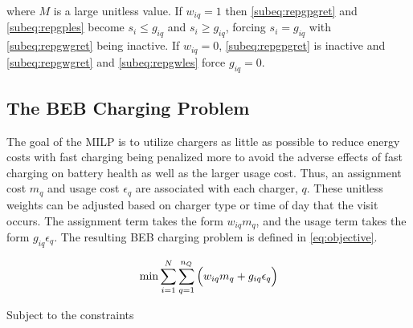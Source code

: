 \documentclass[utf8]{FrontiersinHarvard}
\begin{document}
\noindent where \(M\) is a large unitless value. If \(w_{iq} = 1\) then \autoref{subeq:repgpgret} and
\autoref{subeq:repgples} become \(s_i \leq g_{iq}\) and \(s_i \geq g_{iq}\), forcing \(s_i = g_{iq}\) with \autoref{subeq:repgwgret}
being inactive. If \(w_{iq} = 0\), \autoref{subeq:repgpgret} is inactive and \autoref{subeq:repgwgret} and
\autoref{subeq:repgwles} force \(g_{iq} = 0\).

\subsection{The BEB Charging Problem}
\label{sec:BEB_MILP}
The goal of the MILP is to utilize chargers as little as possible to reduce energy costs with fast charging being
penalized more to avoid the adverse effects of fast charging on battery health as well as the
larger usage cost. Thus, an assignment cost \(m_q\) and usage cost \(\epsilon_q\) are associated with each charger, \(q\).
These unitless weights can be adjusted based on charger type or time of day that the visit
occurs. The assignment term takes the form \(w_{iq}m_q\), and the usage term takes the form \(g_{iq} \epsilon_q\). The
resulting BEB charging problem is defined in \autoref{eq:objective}.

\begin{equation}
\label{eq:objective}
	\min \sum_{i=1}^N \sum_{q=1}^{n_Q} \Big( w_{iq} m_q + g_{iq} \epsilon_q \Big) \\
\end{equation}

Subject to the constraints
\end{document}
